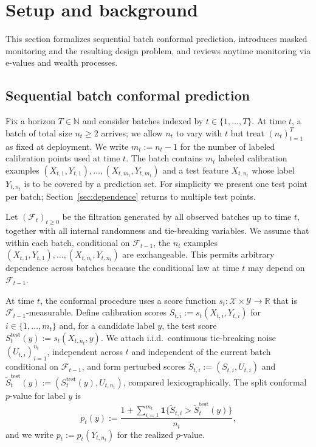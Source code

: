\documentclass{uai2026} %
\newcommand{\N}{\mathbb{N}}
\newcommand{\R}{\mathbb{R}}
\newcommand{\1}{\mathbf{1}}
\newcommand{\ind}[1]{\mathbf{1}\{#1\}}
\newcommand{\xcal}{\mathcal{X}}
\newcommand{\ycal}{\mathcal{Y}}
\newcommand{\F}{\mathcal{F}}
\begin{document}

\section{Setup and background}
\label{sec:setup}

This section formalizes sequential batch conformal prediction, introduces masked monitoring and the resulting design problem, and reviews anytime monitoring via e-values and wealth processes.

\subsection{Sequential batch conformal prediction}
\label{sec:batch}

Fix a horizon $T\in\N$ and consider batches indexed by $t\in\{1,\dots,T\}$.
At time $t$, a batch of total size $n_t\ge 2$ arrives; we allow $n_t$ to vary with $t$ but treat $(n_t)_{t=1}^{T}$ as fixed at deployment.
We write $m_t:=n_t-1$ for the number of labeled calibration points used at time $t$.
The batch contains $m_t$ labeled calibration examples $(X_{t,1},Y_{t,1}),\ldots,(X_{t,m_t},Y_{t,m_t})$ and a test feature $X_{t,n_t}$ whose label $Y_{t,n_t}$ is to be covered by a prediction set.
For simplicity we present one test point per batch; Section~\ref{sec:dependence} returns to multiple test points.

Let $(\F_t)_{t\ge 0}$ be the filtration generated by all observed batches up to time $t$, together with all internal randomness and tie-breaking variables.
We assume that within each batch, conditional on $\F_{t-1}$, the $n_t$ examples $(X_{t,1},Y_{t,1}),\ldots,(X_{t,n_t},Y_{t,n_t})$ are exchangeable.
This permits arbitrary dependence across batches because the conditional law at time $t$ may depend on $\F_{t-1}$.

At time $t$, the conformal procedure uses a score function $s_t:\xcal\times\ycal\to\R$ that is $\F_{t-1}$-measurable.
Define calibration scores $S_{t,i}:=s_t(X_{t,i},Y_{t,i})$ for $i\in\{1,\dots,m_t\}$ and, for a candidate label $y$, the test score $S_t^{\mathrm{test}}(y):=s_t(X_{t,n_t},y)$.
We attach i.i.d.\ continuous tie-breaking noise $(U_{t,i})_{i=1}^{n_t}$, independent across $t$ and independent of the current batch conditional on $\F_{t-1}$, and form perturbed scores $\tilde{S}_{t,i}:=(S_{t,i},U_{t,i})$ and $\tilde{S}_t^{\mathrm{test}}(y):=(S_t^{\mathrm{test}}(y),U_{t,n_t})$, compared lexicographically.
The split conformal $p$-value for label $y$ is
\begin{equation}
  \label{eq:pt-def}
  p_t(y):=\frac{1+\sum_{i=1}^{m_t}\ind{\tilde{S}_{t,i}>\tilde{S}_t^{\mathrm{test}}(y)}}{n_t},
\end{equation}
and we write $p_t:=p_t(Y_{t,n_t})$ for the realized $p$-value.
\end{document}
